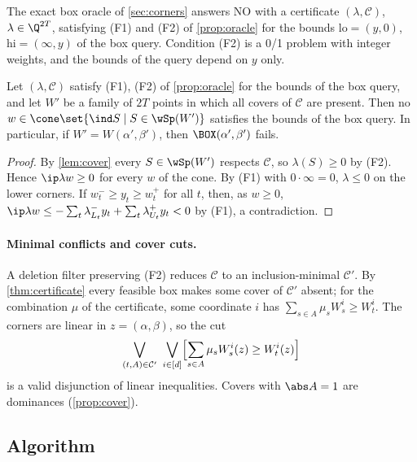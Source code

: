 The exact box oracle of \cref{sec:corners} answers NO with a certificate $(\lambda,\mathcal C)$, $\lambda\in\Q^{2T}$, satisfying (F1) and (F2) of \cref{prop:oracle} for the bounds $\mathrm{lo}=(y,0)$, $\mathrm{hi}=(\infty,y)$ of the box query. Condition (F2) is a 0/1 problem with integer weights, and the bounds of the query depend on $y$ only.
\begin{theorem}[certificate]\label{thm:certificate}
Let $(\lambda,\mathcal C)$ satisfy (F1), (F2) of \cref{prop:oracle} for the bounds of the box query, and let $W'$ be a family of $2T$ points in which all covers of $\mathcal C$ are present. Then no $w\in\cone\set{\ind S\mid S\in\wSp(W')}$ satisfies the bounds of the box query. In particular, if $W'=W(\alpha',\beta')$, then $\BOX(\alpha',\beta')$ fails.
\end{theorem}
\begin{proof}
By \cref{lem:cover} every $S\in\wSp(W')$ respects $\mathcal C$, so $\lambda(S)\ge0$ by (F2). Hence $\ip\lambda w\ge0$ for every $w$ of the cone. By (F1) with $0\cdot\infty=0$, $\lambda\le0$ on the lower corners. If $w^-_t\ge y_t\ge w^+_t$ for all $t$, then, as $w\ge0$, $\ip\lambda w\le-\sum_t\lambda^-_{L_t}y_t+\sum_t\lambda^+_{U_t}y_t<0$ by (F1), a contradiction.
\end{proof}

\paragraph{Minimal conflicts and cover cuts.}\label{sec:conflicts}
A deletion filter preserving (F2) \citep{CodatoFischetti2006} reduces $\mathcal C$ to an inclusion-minimal $\mathcal C'$. By \cref{thm:certificate} every feasible box makes some cover of $\mathcal C'$ absent; for the combination $\mu$ of the certificate, some coordinate $i$ has $\sum_{s\in A}\mu_sW^i_s\ge W^i_t$. The corners are linear in $z=(\alpha,\beta)$, so the cut
\[
\bigvee_{(t,A)\in\mathcal C'}\ \bigvee_{i\in[d]}\Bigl[\sum_{s\in A}\mu_sW^i_s(z)\ge W^i_t(z)\Bigr]
\]
is a valid disjunction of linear inequalities. Covers with $\abs A=1$ are dominances (\cref{prop:cover}).

\subsection{Algorithm}\label{sec:algo}
